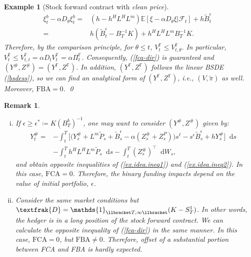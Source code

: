 \documentclass[a4paper, 11pt]{article}              %
\numberwithin{equation}{section}
\theoremstyle{plain}
\newcommand{\1}{\mathds{1}}
\newcommand{\calF}{\mathcal{F}}
\newcommand{\frD}{\textfrak{D}}
\newcommand{\Bt}{\tilde{B}}
\newcommand{\pt}{\tilde{P}}
\newcommand{\pit}{\tilde{\pi}}
\newcommand{\dsE}{\mathbb{E}}
\newcommand{\dsF}{\mathbb{F}}
\theoremstyle{plain}
\theoremstyle{definition}
\newtheorem{remark}[thm]{Remark} %
\newtheorem{example}[thm]{Example}
\theoremstyle{plain}
\newtheorem{example}{Example}
\newtheorem{remark}{Remark}
\newcommand*\df{\mathop{}\!\mathrm{d}}
\begin{document}
\begin{example}[Stock forward contract with \textit{clean price}]
\begin{align} 
  \xi^b_t -\alpha D_{\theta}\xi^b_t =&
  (h-h^HL^HL^m)  \dsE[\xi-\alpha D_{\theta}\xi|\calF_t] +h\Bt^\epsilon_t \nonumber \\
  =&h(\Bt^\epsilon_t - B_T^{-1}K) + h^HL^HL^mB_T^{-1}K.
\end{align}
Therefore, by the comparison principle, for $\theta \leq t$, $V^\dsF_{t} \leq V^\dsF_{t ,
  \theta}$. In particular, $V^\dsF_{t} \leq V^\dsF_{t ,  t} = \alpha D_t V^\dsF_{t} = \alpha
\Pi^\dsF_{t}$. Consequently, (\ref{fca-dir}) is guaranteed and  $(Y^{\#}, Z^{\#}) =
(Y^\dsF, Z^\dsF)$. In addition, $(Y^\dsF, Z^\dsF)$ follows the linear BSDE
(\ref{bsdess}), so we can find an analytical form of $(Y^\dsF, Z^\dsF)$, i.e.,
$(V, \pit)$ as well. Moreover,  $\text{FBA} = 0$.
\qed
\end{example}
\begin{remark} \label{idea:remark}
\begin{enumerate}[(i)]
\item If $\epsilon \geq \epsilon^*\coloneqq K (B^b_T)^{-1}$, one may want to consider $(Y^\#,
  Z^\#)$ given by:
  \begin{align}
     Y^\#_t =& -\int_{t}^{T} \bigg[\big(Y^\#_s +L^m\pt_s +\Bt^\epsilon_s
            -\alpha(Z^\#_s+Z^P_s)\big)s^\ell-s^\epsilon\Bt^\epsilon_s+hY^\#_s\bigg]\df s\nonumber\\
          &-\int_{t}^{T} h^HL^HL^m \pt_s\df s
            -\int_{t}^{T}(Z^\#_s)^\top\df W_s, \nonumber      
  \end{align}
and obtain opposite inequalities of (\ref{ex.idea.ineq1}) and
(\ref{ex.idea.ineq2}). In this case, $\text{FCA}=0$. Therefore, the binary funding
impacts depend on the value of initial portfolio, $\epsilon$. 
\item Consider the same market conditions but
 $\frD = \1_{\llbracket T, \infty \llbracket }(K-S^1_T)$. 
In other words, the hedger is in a long position of the stock forward contract. We can
calculate  the opposite inequality of (\ref{fca-dir}) in the same manner. In this
case, $\text{FCA}=0$, but $\text{FBA}\not=0$. Therefore, offset of a
substantial portion between FCA and FBA is hardly expected.
\end{enumerate}
\end{remark}
\end{document}
